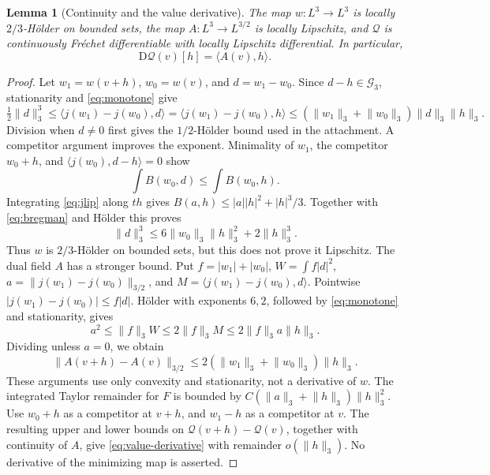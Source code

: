 \documentclass[11pt,a4paper]{article}
\newtheorem{lemma}[theorem]{Lemma}
\theoremstyle{definition}
\theoremstyle{remark}
\newcommand{\G}{\mathcal G_3}
\newcommand{\Q}{\mathcal Q}
\newcommand{\norm}[1]{\lVert #1\rVert}
\newcommand{\ip}[2]{\langle #1,#2\rangle}
\numberwithin{equation}{section}
\begin{document}
\begin{lemma}[Continuity and the value derivative]\label{lem:derivative}
The map \(w:L^3\to L^3\) is locally \(2/3\)-Hölder on bounded sets, the map \(A:L^3\to L^{3/2}\) is locally Lipschitz, and \(\Q\) is continuously Fréchet differentiable with locally Lipschitz differential. In particular,
\begin{equation}\label{eq:value-derivative}
\mathrm D\Q(v)[h]=\ip{A(v)}h.
\end{equation}
\end{lemma}
\begin{proof}
Let \(w_1=w(v+h)\), \(w_0=w(v)\), and \(d=w_1-w_0\). Since \(d-h\in\G\), stationarity and \eqref{eq:monotone} give
\[
\tfrac12\norm d_3^3
\le\ip{j(w_1)-j(w_0)}d
=\ip{j(w_1)-j(w_0)}h
\le(\norm{w_1}_3+\norm{w_0}_3)\norm d_3\norm h_3.
\]
Division when \(d\ne0\) first gives the \(1/2\)-Hölder bound used in the attachment. A competitor argument improves the exponent. Minimality of \(w_1\), the competitor \(w_0+h\), and \(\ip{j(w_0)}{d-h}=0\) show
\[
\int B(w_0,d)\le\int B(w_0,h).
\]
Integrating \eqref{eq:jlip} along \(th\) gives \(B(a,h)\le |a||h|^2+|h|^3/3\). Together with \eqref{eq:bregman} and Hölder this proves
\begin{equation}\label{eq:twothirds}
\norm d_3^3\le6\norm{w_0}_3\norm h_3^2+2\norm h_3^3.
\end{equation}
Thus \(w\) is \(2/3\)-Hölder on bounded sets, but this does not prove it Lipschitz. The dual field \(A\) has a stronger bound. Put \(f=|w_1|+|w_0|\), \(W=\int f|d|^2\), \(a=\norm{j(w_1)-j(w_0)}_{3/2}\), and \(M=\ip{j(w_1)-j(w_0)}d\). Pointwise \(|j(w_1)-j(w_0)|\le f|d|\). Hölder with exponents \(6,2\), followed by \eqref{eq:monotone} and stationarity, gives
\[
a^2\le\norm f_3 W\le2\norm f_3 M
\le2\norm f_3a\norm h_3.
\]
Dividing unless \(a=0\), we obtain
\begin{equation}\label{eq:dual-lip}
\norm{A(v+h)-A(v)}_{3/2}
\le2(\norm{w_1}_3+\norm{w_0}_3)\norm h_3.
\end{equation}
These arguments use only convexity and stationarity, not a derivative of \(w\). The integrated Taylor remainder for \(F\) is bounded by
\(C(\norm a_3+\norm h_3)\norm h_3^2\).
Use \(w_0+h\) as a competitor at \(v+h\), and \(w_1-h\) as a competitor at \(v\). The resulting upper and lower bounds on \(\Q(v+h)-\Q(v)\), together with continuity of \(A\), give \eqref{eq:value-derivative} with remainder \(o(\norm h_3)\). No derivative of the minimizing map is asserted.
\end{proof}
\end{document}
